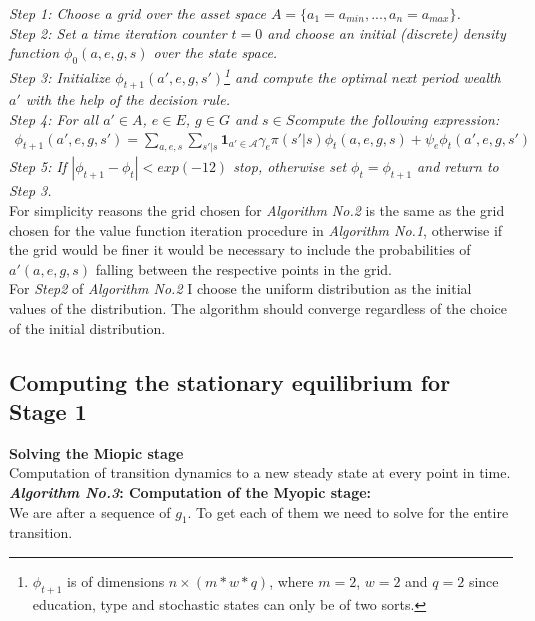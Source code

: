 \noindent\textit{Step 1: Choose a grid over the asset space $A=\{a_{1}=a_{min},...,a_{n}=a_{max}\}$.\\
Step 2: Set a time iteration counter $t=0$ and choose an initial (discrete) density function $\phi_{0}(a,e,g,s)$ over the state space.\\
Step 3: Initialize $\phi_{t+1}(a',e,g,s')$\footnote{$\phi_{t+1}$ is of dimensions $n\times (m*w*q)$, where $m=2$, $w=2$ and $q=2$ since education, type and stochastic states can only be of two sorts.} and compute the optimal next period wealth $a'$ with the help of the decision rule.\\
Step 4: For all $a'\in A$, $e \in E$, $g \in G$ and $s \in S$compute the following expression:}
\begin{align}\label{eq:10}
    \phi_{t+1}(a',e,g,s')=\sum_{a,e,s}\sum_{s'|s}\textbf{1}_{a'\in\mathcal{A}}\gamma_{e}\pi(s'|s)\phi_{t}(a,e,g,s) + \psi_{e}\phi_{t}(a',e,g,s')
\end{align}
\textit{
Step 5: If $|\phi_{t+1}-\phi_{t}|<exp(-12)$ stop, otherwise set $\phi_{t}=\phi_{t+1}$ and return to Step 3.}\\

For simplicity reasons the grid chosen for \textit{Algorithm No.2} is the same as the grid chosen for the value function iteration procedure in \textit{Algorithm No.1}, otherwise if the grid would be finer it would be necessary to include the probabilities of $a'(a,e,g,s)$ falling between the respective points in the grid.\\

For \textit{Step2} of \textit{Algorithm No.2} I choose the uniform distribution as the initial values of the distribution. The algorithm should converge regardless of the choice of the initial distribution.


\subsection*{Computing the stationary equilibrium for Stage 1}

\textbf{Solving the Miopic stage}\\
Computation of transition dynamics to a new steady state at every point in time.\\
\noindent \textbf{\textit{Algorithm No.3}: Computation of the Myopic stage:}\\


We are after a sequence of $g_1$. To get each of them we need to solve for the entire transition.

